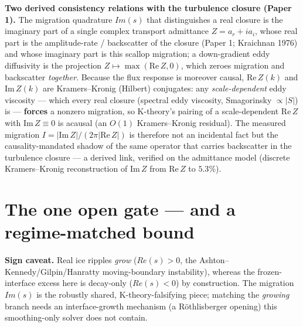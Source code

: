 \documentclass[tc, manuscript]{copernicus}
\begin{document}
\textbf{Two derived consistency relations with the turbulence closure (Paper 1).} The migration quadrature $Im(s)$ that distinguishes a real closure is the imaginary part of a single complex transport admittance $Z=a_{r}+ia_{i}$, whose real part is the amplitude-rate / backscatter of the closure (Paper 1; Kraichnan 1976) and whose imaginary part is this scallop migration; a down-gradient eddy diffusivity is the projection $Z\mapsto \max(\mathrm{Re}\,Z,0)$, which zeroes migration and backscatter \emph{together}. Because the flux response is moreover causal, $\mathrm{Re}\,Z(k)$ and $\mathrm{Im}\,Z(k)$ are Kramers--Kronig (Hilbert) conjugates: any \emph{scale-dependent} eddy viscosity --- which every real closure (spectral eddy viscosity, Smagorinsky $\propto |S|$) is --- \textbf{forces} a nonzero migration, so K-theory's pairing of a scale-dependent $\mathrm{Re}\,Z$ with $\mathrm{Im}\,Z\equiv 0$ is acausal (an $O(1)$ Kramers--Kronig residual). The measured migration $I=|\mathrm{Im}\,Z|/(2\pi |\mathrm{Re}\,Z|)$ is therefore not an incidental fact but the causality-mandated shadow of the same operator that carries backscatter in the turbulence closure --- a derived link, verified on the admittance model (discrete Kramers--Kronig reconstruction of $\mathrm{Im}\,Z$ from $\mathrm{Re}\,Z$ to $5.3\%$).

\section{The one open gate — and a regime-matched bound}

\textbf{Sign caveat.} Real ice ripples \emph{grow} ($Re(s)>0$, the Ashton–Kennedy/Gilpin/Hanratty moving-boundary instability), whereas the frozen-interface excess here is decay-only ($Re(s)<0$) by construction. The migration $Im(s)$ is the robustly shared, K-theory-falsifying piece; matching the \emph{growing} branch needs an interface-growth mechanism (a Röthlisberger opening) this smoothing-only solver does not contain.
\end{document}
